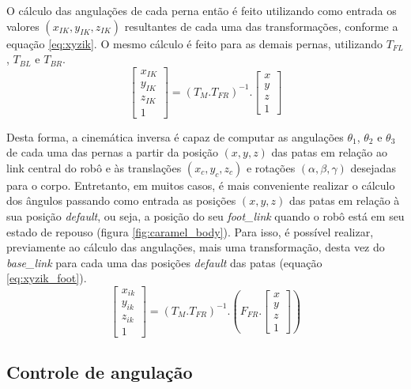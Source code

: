 \documentclass[conference]{IEEEtran}
\begin{document}
O cálculo das angulações de cada perna então é feito utilizando como entrada os valores $(x_{IK}, y_{IK}, z_{IK})$ resultantes de cada uma das transformações, conforme a equação \ref{eq:xyzik}. O mesmo cálculo é feito para as demais pernas, utilizando  $T_{FL}$, $T_{BL}$ e $T_{BR}$.
\begin{equation}
  \label{eq:xyzik}
  \begin{bmatrix}
    x_{IK} \\
    y_{IK} \\
    z_{IK} \\
    1
  \end{bmatrix}= (T_M.T_{FR})^{-1}.
  \begin{bmatrix}
    x \\
    y \\
    z \\
    1
  \end{bmatrix}
\end{equation}

Desta forma, a cinemática inversa é capaz de computar as angulações  $\theta_1$, $\theta_2$ e $\theta_3$ de cada uma das pernas a partir da posição $(x, y, z)$ das patas em relação ao link central do robô e às translações $(x_c, y_c, z_c)$ e rotações $(\alpha, \beta, \gamma)$ desejadas para o corpo. Entretanto, em muitos casos, é mais conveniente realizar o cálculo dos ângulos passando como entrada as posições $(x, y, z)$ das patas em relação à sua posição \textit{default}, ou seja, a posição do seu \textit{foot\_link} quando o robô está em seu estado de repouso (figura \ref{fig:caramel_body}). Para isso, é possível realizar, previamente ao cálculo das angulações, mais uma transformação, desta vez do \textit{base\_link} para cada uma das posições \textit{default} das patas (equação \ref{eq:xyzik_foot}).
\begin{equation}
  \label{eq:xyzik_foot}
  \begin{bmatrix}
    x_{ik} \\
    y_{ik} \\
    z_{ik} \\
    1
  \end{bmatrix}= (T_M.T_{FR})^{-1}.
  (F_{FR}.
  \begin{bmatrix}
    x \\
    y \\
    z \\
    1
  \end{bmatrix})
\end{equation}

\subsection{Controle de angulação}
\end{document}
